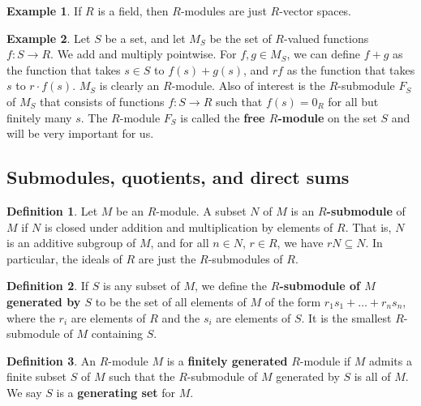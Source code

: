 \documentclass{article}
\newcommand{\rb}[1]{\left( #1 \right)}
\theoremstyle{definition}\newtheorem{definition}{Definition}[subsection]
\theoremstyle{definition}\newtheorem{remark}[definition]{Remark}
\theoremstyle{definition}\newtheorem*{example}{Example}
\theoremstyle{definition}\newtheorem*{note}{Note}
\begin{document}
\begin{example}
If $ R $ is a field, then $ R $-modules are just $ R $-vector spaces.
\end{example}

\begin{example}
Let $ S $ be a set, and let $ M_S $ be the set of $ R $-valued functions $ f : S \to R $. We add and multiply pointwise. For $ f, g \in M_S $, we can define $ f + g $ as the function that takes $ s \in S $ to $ f\rb{s} + g\rb{s} $, and $ rf $ as the function that takes $ s $ to $ r \cdot f\rb{s} $. $ M_S $ is clearly an $ R $-module. Also of interest is the $ R $-submodule $ F_S $ of $ M_S $ that consists of functions $ f : S \to R $ such that $ f\rb{s} = 0_R $ for all but finitely many $ s $. The $ R $-module $ F_S $ is called the \textbf{free $ R $-module} on the set $ S $ and will be very important for us.
\end{example}

\subsection{Submodules, quotients, and direct sums}

\begin{definition}
Let $ M $ be an $ R $-module. A subset $ N $ of $ M $ is an \textbf{$ R $-submodule} of $ M $ if $ N $ is closed under addition and multiplication by elements of $ R $. That is, $ N $ is an additive subgroup of $ M $, and for all $ n \in N $, $ r \in R $, we have $ rN \subseteq N $. In particular, the ideals of $ R $ are just the $ R $-submodules of $ R $.
\end{definition}

\begin{definition}
If $ S $ is any subset of $ M $, we define the \textbf{$ R $-submodule of $ M $ generated by $ S $} to be the set of all elements of $ M $ of the form $ r_1s_1 + \dots + r_ns_n $, where the $ r_i $ are elements of $ R $ and the $ s_i $ are elements of $ S $. It is the smallest $ R $-submodule of $ M $ containing $ S $.
\end{definition}

\begin{definition}
An $ R $-module $ M $ is a \textbf{finitely generated} $ R $-module if $ M $ admits a finite subset $ S $ of $ M $ such that the $ R $-submodule of $ M $ generated by $ S $ is all of $ M $. We say $ S $ is a \textbf{generating set} for $ M $.
\end{definition}
\end{document}
